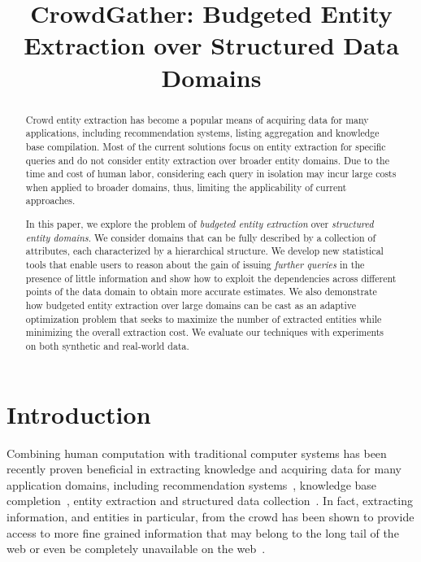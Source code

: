 \documentclass{sig-alternate}
\begin{document}

\title{CrowdGather: Budgeted Entity Extraction over Structured Data Domains}


\author{
}

\maketitle

\begin{abstract}
Crowd entity extraction has become a popular means of acquiring data for many applications, including recommendation systems, listing aggregation and knowledge base compilation.  Most of the current solutions focus on entity extraction for specific queries and do not consider entity extraction over broader entity domains. Due to the time and cost of human labor, considering each query in isolation may incur large costs when applied to broader domains, thus, limiting the applicability of current approaches.
 
In this paper, we explore the problem of {\em budgeted entity extraction} over {\em structured entity domains}. We consider domains that can be fully described by a collection of attributes, each characterized by a hierarchical structure. We develop new statistical tools that enable users to reason about the gain of issuing {\em further queries} in the presence of little information and show how to exploit the dependencies across different points of the data domain to obtain more accurate estimates. We also demonstrate how budgeted entity extraction over large domains can be cast as an adaptive optimization problem that seeks to maximize the number of extracted entities while minimizing the overall extraction cost. We evaluate our techniques with experiments on both synthetic and real-world data. 
\end{abstract}

\section{Introduction}
\label{sec:intro}
Combining human computation with traditional computer systems has been recently proven beneficial in extracting knowledge and acquiring data for many application domains, including recommendation systems~\cite{amsterdamer:2014}, knowledge base completion~\cite{kondredi:2014}, entity extraction and structured data collection~\cite{trushkowsky:2013, park:2014}. In fact, extracting information, and entities in particular, from the crowd has been shown to provide access to more fine grained information that may belong to the long tail of the web or even be completely unavailable on the web~\cite{west:2014}.
\end{document}
